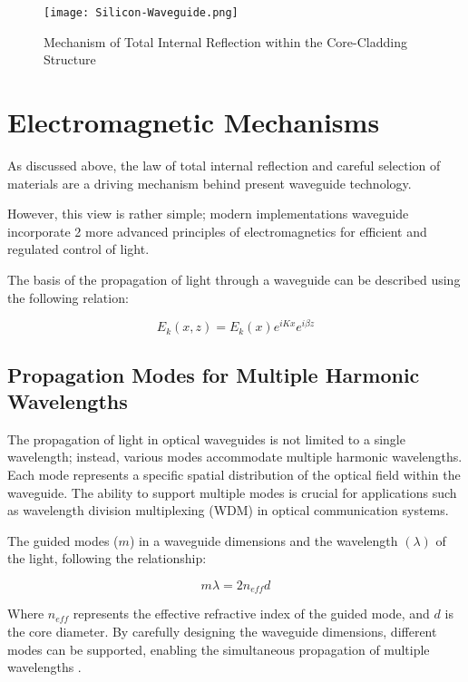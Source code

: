 \documentclass[10pt]{article}
\begin{document}
\begin{figure}[h]
    \centering
    \texttt{[image: Silicon-Waveguide.png]}
    \caption{Mechanism of Total Internal Reflection within the Core-Cladding Structure} 
    \end{figure}

\section{Electromagnetic Mechanisms}

As discussed above, the law of total internal reflection and careful selection of materials are a driving mechanism behind present waveguide technology.

However, this view is rather simple; modern implementations waveguide incorporate 2 more advanced principles of electromagnetics for 
efficient and regulated control of light. 

The basis of the propagation of light through a waveguide can be described using the following relation:

\begin{equation}
    E_k(x, z) = E_k(x)e^{iKx}e^{i\beta z}
\end{equation}

\subsection{Propagation Modes for Multiple Harmonic Wavelengths}
The propagation of light in optical waveguides is not limited to a single wavelength; instead, various modes accommodate multiple harmonic wavelengths. Each mode represents a specific spatial distribution of the optical field within the waveguide. The ability to support multiple modes is crucial for applications such as wavelength division multiplexing (WDM) in optical communication systems.

The guided modes ($m$) in a waveguide dimensions and the wavelength $(\lambda)$ of the light, following the relationship:

\begin{equation}
    m\lambda = 2n_{eff}d
\end{equation}

Where $n_{eff}$ represents the effective refractive index of the guided mode, and
$d$ is the core diameter. By carefully designing the waveguide dimensions, different modes can be supported, enabling the simultaneous propagation of multiple wavelengths \cite{ref03}.
\end{document}
